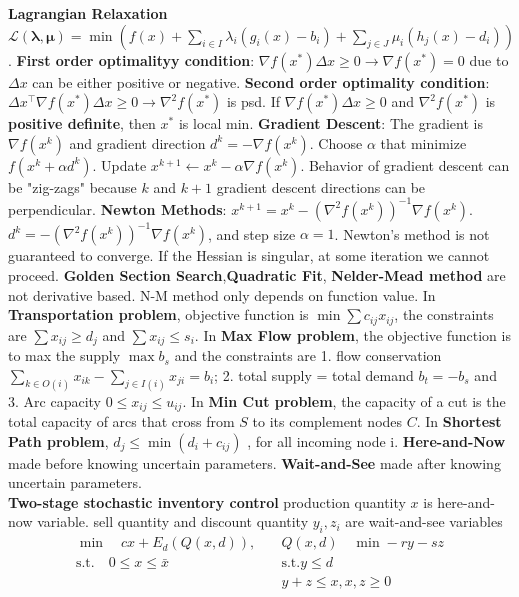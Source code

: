 \documentclass{article}
\begin{document}
\textbf{Lagrangian Relaxation} $\mathcal{L}(\bm{\lambda},\bm{\mu}) = \min(f(x) + \sum_{i\in I}\lambda_i(g_i(x)-b_i)+\sum_{j\in J}\mu_i(h_j(x)-d_i))$.
\textbf{First order optimalityy condition}: $\nabla f(x^{*})\Delta x \ge 0 \to \nabla f(x^{*})=0$ due to $\Delta x$ can be either positive or negative.
\textbf{Second order optimality condition}: $\Delta x^{\top} \nabla f(x^{*})\Delta x \ge 0 \to \nabla^2 f(x^{*})$ is psd.
If $\nabla f(x^{*})\Delta x \ge 0$ and $\nabla^2 f(x^{*})$ is \textbf{positive definite}, then $x^{*}$ is local min.
\textbf{Gradient Descent}: The gradient is $\nabla f(x^{k})$ and gradient direction $d^{k}=-\nabla f(x^{k})$. Choose $\alpha$ that minimize $f(x^{k}+\alpha d^{k})$. Update $x^{k+1} \leftarrow x^{k} - \alpha \nabla f(x^{{k}})$. Behavior of gradient descent can be "zig-zags" because $k$ and $k+1$ gradient descent directions can be perpendicular.
\textbf{Newton Methods}: $x^{k+1}=x^{k}-(\nabla^2f(x^k))^{-1}\nabla f(x^k)$. $d^{k}=-(\nabla^2f(x^k))^{-1}\nabla f(x^{k})$, and step size $\alpha=1$. Newton's method is not guaranteed to converge. If the Hessian is singular, at some iteration we cannot proceed.
\textbf{Golden Section Search},\textbf{Quadratic Fit}, \textbf{Nelder-Mead method} are not derivative based. N-M method only depends on function value.
In \textbf{Transportation problem}, objective function is $\min \sum c_{ij}x_{ij}$, the constraints are $\sum x_{ij} \ge d_{j}$ and $\sum x_{ij} \le s_i$.
In \textbf{Max Flow problem}, the objective function is to max the supply $\max b_s$ and the constraints are 1. flow conservation$\sum_{k \in O(i)} x_{ik} - \sum_{j \in I(i)} x_{ji}=b_i$; 2. total supply = total demand $b_t = -b_s$ and 3. Arc capacity $0 \le x_{ij} \le u_{ij}$. 
In \textbf{Min Cut problem}, the capacity of a cut is the total capacity of arcs that cross from $S$ to its complement nodes $C$.
In \textbf{Shortest Path problem}, $d_j \le \min (d_i + c_{ij})$ , for all incoming node i.
\textbf{Here-and-Now} made before knowing uncertain parameters.
\textbf{Wait-and-See} made after knowing uncertain parameters. \\
\textbf{Two-stage stochastic inventory control} production quantity $x$ is here-and-now variable. sell quantity and discount quantity $y_i,z_i$ are wait-and-see variables
\begin{align}
    \min \quad cx + \textit{E}_{d}(Q(x,d)), & \quad Q(x,d) \quad \min -ry - sz \\
    \text{s.t.} \quad 0 \le x \le \bar{x} & \quad \text{s.t.} y \le d \\
    & \quad y + z \le x, x, z \ge 0
\end{align}
\end{document}
